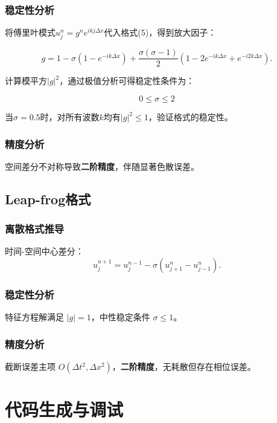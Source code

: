 \documentclass[UTF8]{ctexart}
\begin{document}
\subsubsection{稳定性分析}

将傅里叶模式$u_j^n = g^n e^{ikj\Delta x}$代入格式(5)，得到放大因子：

\begin{equation}
g=1-\sigma\left(1-e^{-i k\Delta x}\right)+\frac{\sigma(\sigma-1)}{2}\left(1-2 e^{-i k\Delta x}+e^{-i 2 k\Delta x}\right). 
\end{equation}

计算模平方$|g|^2$，通过极值分析可得稳定性条件为：

$$
0 \leq \sigma \leq 2
$$

当$\sigma=0.5$时，对所有波数$k$均有$|g|^2 \leq 1$，验证格式的稳定性。

\subsubsection{精度分析}
空间差分不对称导致\textbf{二阶精度}，伴随显著色散误差。

\subsection{Leap-frog格式}
\subsubsection{离散格式推导}
时间-空间中心差分：
\begin{equation}
u_j^{n+1} = u_j^{n-1} - \sigma(u_{j+1}^n - u_{j-1}^n).
\end{equation}

\subsubsection{稳定性分析}
特征方程解满足 $|g| = 1$，中性稳定条件 $\sigma \leq 1$。

\subsubsection{精度分析}
截断误差主项 $O(\Delta t^2, \Delta x^2)$，\textbf{二阶精度}，无耗散但存在相位误差。



\section{代码生成与调试}
\end{document}
